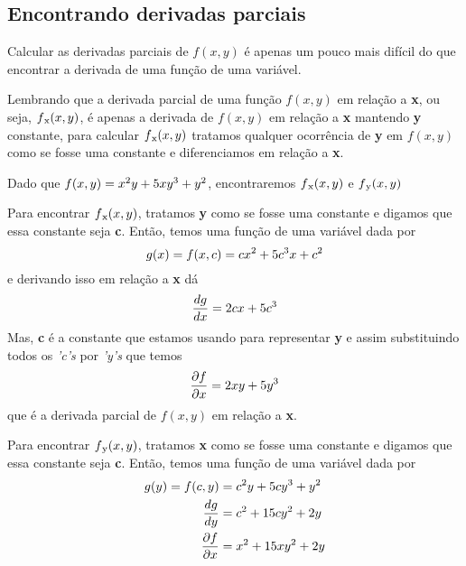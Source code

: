 \documentclass[a4paper]{article}
\begin{document}
\subsection*{Encontrando derivadas parciais}
Calcular as derivadas parciais de $f(x,y)$ é apenas um pouco mais difícil do que encontrar a derivada de uma função de uma variável.

\par Lembrando que a derivada parcial de uma função $f(x,y)$ em relação a \textbf{x}, ou seja, $f\textsubscript{x}(x,y)$, é apenas a derivada de $f(x,y)$ em relação a \textbf{x} mantendo \textbf{y} constante, para calcular $f\textsubscript{x}(x,y)$ tratamos qualquer ocorrência de \textbf{y} em $f(x,y)$ como se fosse uma constante e diferenciamos em relação a \textbf{x}.
\par Dado que $f(x,y) = x\textsuperscript{2}y + 5xy\textsuperscript{3} + y\textsuperscript{2}$, encontraremos $f\textsubscript{x}(x,y)$ e $f\textsubscript{y}(x,y)$
\par Para encontrar $f\textsubscript{x}(x,y)$, tratamos \textbf{y} como se fosse uma constante e digamos que essa constante seja \textbf{c}. Então, temos uma função de uma variável dada por
\begin{equation}
    g(x) = f(x,c) = cx\textsuperscript{2} + 5c\textsuperscript{3}x + c\textsuperscript{2}
\end{equation}
e derivando isso em relação a \textbf{x} dá
\begin{equation}
    \frac{dg}{dx} = 2cx + 5c\textsuperscript{3}
\end{equation}
Mas, \textbf{c} é a constante que estamos usando para representar \textbf{y} e assim substituindo todos os \textit{'c's} por \textit{'y's} que temos
\begin{equation}
    \frac{\partial f}{\partial x} = 2xy + 5y\textsuperscript{3}
\end{equation}
que é a derivada parcial de $f(x,y)$ em relação a \textbf{x}.
\par Para encontrar $f\textsubscript{y}(x,y)$, tratamos \textbf{x} como se fosse uma constante e digamos que essa constante seja \textbf{c}. Então, temos uma função de uma variável dada por
\begin{equation}
    \begin{split}    
        g(y) = f(c,y)  & = c\textsuperscript{2}y + 5cy\textsuperscript{3} + y\textsuperscript{2} \\
        \frac{dg}{dy} & =  c\textsuperscript{2} + 15cy\textsuperscript{2} + 2y \\
        \frac{\partial f}{\partial x} & = x\textsuperscript{2} + 15xy\textsuperscript{2} + 2y
    \end{split}
\end{equation}
\end{document}
